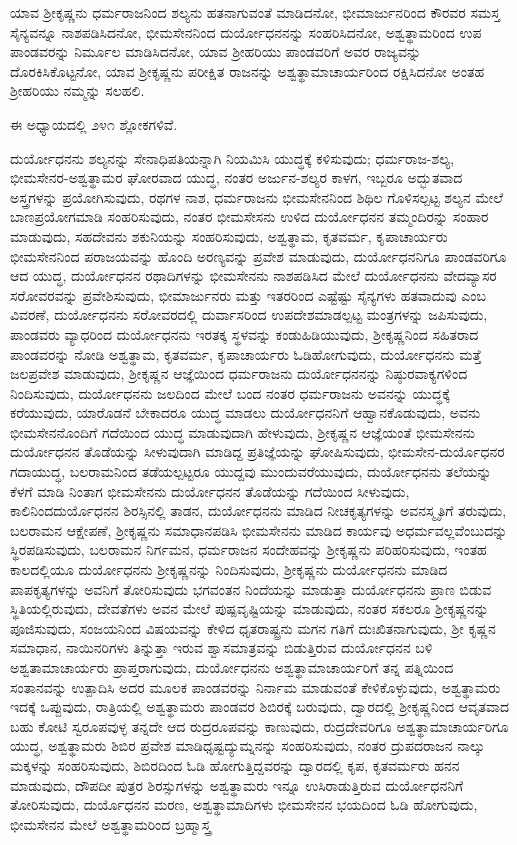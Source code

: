 ಯಾವ ಶ‍್ರೀಕೃಷ್ಣನು ಧರ್ಮರಾಜನಿಂದ ಶಲ್ಯನು ಹತನಾಗುವಂತೆ ಮಾಡಿದನೋ, ಭೀಮಾರ್ಜುನರಿಂದ ಕೌರವರ ಸಮಸ್ತ ಸೈನ್ಯವನ್ನೂ ನಾಶಪಡಿಸಿದನೋ, ಭೀಮಸೇನನಿಂದ ದುರ್ಯೋಧನನನ್ನು ಸಂಹರಿಸಿದನೋ, ಅಶ್ವತ್ಥಾಮರಿಂದ ಉಪ ಪಾಂಡವರನ್ನು ನಿರ್ಮೂಲ ಮಾಡಿಸಿದನೋ, ಯಾವ ಶ‍್ರೀಹರಿಯು ಪಾಂಡವರಿಗೆ ಅವರ ರಾಜ್ಯವನ್ನು ದೊರಕಿಸಿಕೊಟ್ಟನೋ, ಯಾವ ಶ‍್ರೀಕೃಷ್ಣನು ಪರೀಕ್ಷಿತ ರಾಜನನ್ನು ಅಶ್ವತ್ಥಾಮಾಚಾರ್ಯರಿಂದ ರಕ್ಷಿಸಿದನೋ ಅಂತಹ ಶ‍್ರೀಹರಿಯು ನಮ್ಮನ್ನು ಸಲಹಲಿ.

ಈ ಅಧ್ಯಾಯದಲ್ಲಿ ೨೪೧ ಶ್ಲೋಕಗಳಿವೆ.

ದುರ್ಯೋಧನನು ಶಲ್ಯನನ್ನು ಸೇನಾಧಿಪತಿಯನ್ನಾಗಿ ನಿಯಮಿಸಿ ಯುದ್ಧಕ್ಕೆ ಕಳಿಸುವುದು; ಧರ್ಮರಾಜ-ಶಲ್ಯ, ಭೀಮಸೇನರ-ಅಶ್ವತ್ಥಾಮರ ಘೋರವಾದ ಯುದ್ಧ, ನಂತರ ಅರ್ಜುನ-ಶಲ್ಯರ ಕಾಳಗ, ಇಬ್ಬರೂ ಅದ್ಭುತವಾದ ಅಸ್ತ್ರಗಳನ್ನು ಪ್ರಯೋಗಿಸುವುದು, ರಥಗಳ ನಾಶ, ಧರ್ಮರಾಜನು ಭೀಮಸೇನನಿಂದ ಶಿಥಿಲ ಗೊಳಿಸಲ್ಪಟ್ಟ ಶಲ್ಯನ ಮೇಲೆ ಬಾಣಪ್ರಯೋಗಮಾಡಿ ಸಂಹರಿಸುವುದು, ನಂತರ ಭೀಮಸೇಸನು ಉಳಿದ ದುರ್ಯೋಧನನ ತಮ್ಮಂದಿರನ್ನು ಸಂಹಾರ ಮಾಡುವುದು, ಸಹದೇವನು ಶಕುನಿಯನ್ನು ಸಂಹರಿಸುವುದು, ಅಶ್ವತ್ಥಾಮ, ಕೃತವರ್ಮ, ಕೃಪಾಚಾರ್ಯರು ಭೀಮಸೇನನಿಂದ ಪರಾಜಯವನ್ನು ಹೊಂದಿ ಅರಣ್ಯವನ್ನು ಪ್ರವೇಶ ಮಾಡುವುದು, ದುರ್ಯೋಧನನಿಗೂ ಪಾಂಡವರಿಗೂ ಆದ ಯುದ್ಧ, ದುರ್ಯೋಧನನ ರಥಾದಿಗಳನ್ನು ಭೀಮಸೇನನು ನಾಶಪಡಿಸಿದ ಮೇಲೆ ದುರ್ಯೋಧನನು ವೇದವ್ಯಾಸರ ಸರೋವರವನ್ನು ಪ್ರವೇಶಿಸುವುದು, ಭೀಮಾರ್ಜುನರು ಮತ್ತು ಇತರರಿಂದ ಎಷ್ಟೆಷ್ಟು ಸೈನ್ಯಗಳು ಹತವಾದುವು ಎಂಬ ವಿವರಣೆ, ದುರ್ಯೋಧನನು ಸರೋವರದಲ್ಲಿ ದುರ್ವಾಸರಿಂದ ಉಪದೇಶಮಾಡಲ್ಪಟ್ಟ ಮಂತ್ರಗಳನ್ನು ಜಪಿಸುವುದು, ಪಾಂಡವರು ವ್ಯಾಧರಿಂದ ದುರ್ಯೋಧನನು ಇರತಕ್ಕ ಸ್ಥಳವನ್ನು ಕಂಡುಹಿಡಿಯುವುದು, ಶ‍್ರೀಕೃಷ್ಣನಿಂದ ಸಹಿತರಾದ ಪಾಂಡವರನ್ನು ನೋಡಿ ಅಶ್ವತ್ಥಾಮ, ಕೃತವರ್ಮ, ಕೃಪಾಚಾರ್ಯರು ಓಡಿಹೋಗುವುದು, ದುರ್ಯೋಧನನು ಮತ್ತೆ ಜಲಪ್ರವೇಶ ಮಾಡುವುದು, ಶ‍್ರೀಕೃಷ್ಣನ ಆಜ್ಞೆಯಿಂದ ಧರ್ಮರಾಜನು ದುರ್ಯೋಧನನನ್ನು ನಿಷ್ಠುರವಾಕ್ಯಗಳಿಂದ ನಿಂದಿಸುವುದು, ದುರ್ಯೋಧನನು ಜಲದಿಂದ ಮೇಲೆ ಬಂದ ನಂತರ ಧರ್ಮರಾಜನು ಅವನನ್ನು ಯುದ್ಧಕ್ಕೆ ಕರೆಯುವುದು, ಯಾರೊಡನೆ ಬೇಕಾದರೂ ಯುದ್ಧ ಮಾಡಲು ದುರ್ಯೋಧನನಿಗೆ ಆಹ್ವಾನಕೊಡುವುದು, ಅವನು ಭೀಮಸೇನನೊಂದಿಗೆ ಗದೆಯಿಂದ ಯುದ್ಧ ಮಾಡುವುದಾಗಿ ಹೇಳುವುದು, ಶ‍್ರೀಕೃಷ್ಣನ ಆಜ್ಞೆಯಂತೆ ಭೀಮಸೇನನು ದುರ್ಯೋಧನನ ತೊಡೆಯನ್ನು ಸೀಳುವುದಾಗಿ ಮಾಡಿದ್ದ ಪ್ರತಿಜ್ಞೆಯನ್ನು ಘೋಷಿಸುವುದು, ಭೀಮಸೇನ-ದುರ್ಯೊಧನರ ಗದಾಯುದ್ಧ, ಬಲರಾಮನಿಂದ ತಡೆಯಲ್ಪಟ್ಟರೂ ಯುದ್ದವು ಮುಂದುವರೆಯುವುದು, ದುರ್ಯೋಧನನು ತಲೆಯನ್ನು ಕೆಳಗೆ ಮಾಡಿ ನಿಂತಾಗ ಭೀಮ\-ಸೇನನು ದುರ್ಯೋಧನನ ತೊಡೆಯನ್ನು ಗದೆಯಿಂದ ಸೀಳುವುದು, ಕಾಲಿನಿಂದ\break ದುರ್ಯೊಧನನ ಶಿರಸ್ಸಿನಲ್ಲಿ ತಾಡನ, ದುರ್ಯೋಧನನು ಮಾಡಿದ ನೀಚಕೃತ್ಯಗಳನ್ನು ಅವನಸ್ಮೃತಿಗೆ ತರುವುದು, ಬಲರಾಮನ ಆಕ್ಷೇಪಣೆ, ಶ‍್ರೀಕೃಷ್ಣನು ಸಮಾಧಾನಪಡಿಸಿ ಭೀಮಸೇನನು ಮಾಡಿದ ಕಾರ್ಯವು ಅಧರ್ಮವಲ್ಲವೆಂಬುದನ್ನು ಸ್ಥಿರಪಡಿಸುವುದು, ಬಲರಾಮನ ನಿರ್ಗಮನ, ಧರ್ಮರಾಜನ ಸಂದೇಹವನ್ನು ಶ‍್ರೀಕೃಷ್ಣನು ಪರಿಹರಿಸುವುದು, ಇಂತಹ ಕಾಲದಲ್ಲಿಯೂ ದುರ್ಯೋಧನನು ಶ‍್ರೀಕೃಷ್ಣನನ್ನು ನಿಂದಿಸುವುದು, ಶ‍್ರೀಕೃಷ್ಣನು ದುರ್ಯೋಧನನು ಮಾಡಿದ ಪಾಪಕೃತ್ಯಗಳನ್ನು ಅವನಿಗೆ ತೋರಿಸುವುದು ಭಗವಂತನ ನಿಂದೆಯನ್ನು ಮಾಡುತ್ತಾ ದುರ್ಯೋಧನನು ಪ್ರಾಣ ಬಿಡುವ ಸ್ಥಿತಿಯಲ್ಲಿರುವುದು, ದೇವತೆಗಳು ಅವನ ಮೇಲೆ ಪುಷ್ಪವೃಷ್ಟಿಯನ್ನು ಮಾಡುವುದು, ನಂತರ ಸಕಲರೂ ಶ‍್ರೀಕೃಷ್ಣನನ್ನು ಪೂಜಿಸುವುದು, ಸಂಜಯನಿಂದ ವಿಷಯವನ್ನು ಕೇಳಿದ ಧೃತರಾಷ್ಟ್ರನು ಮಗನ ಗತಿಗೆ ದುಃಖಿತನಾಗುವುದು, ಶ‍್ರೀ ಕೃಷ್ಣನ ಸಮಾಧಾನ, ನಾಯಿನರಿಗಳು ತಿನ್ನುತ್ತಾ ಇರುವ ಶ್ವಾಸಮಾತ್ರವನ್ನು ಬಿಡುತ್ತಿರುವ ದುರ್ಯೋಧನನ ಬಳಿ ಅಶ್ವತಾಮಾಚಾರ್ಯರು ಪ್ರಾಪ್ತರಾಗುವುದು, ದುರ್ಯೋಧನನು ಅಶ್ವತ್ಥಾಮಾಚಾರ್ಯರಿಗೆ ತನ್ನ ಪತ್ನಿಯಿಂದ ಸಂತಾನವನ್ನು ಉತ್ಪಾದಿಸಿ ಅದರ ಮೂಲಕ ಪಾಂಡವರನ್ನು ನಿರ್ನಾಮ ಮಾಡುವಂತೆ ಕೇಳಿಕೊಳ್ಳುವುದು, ಅಶ್ವತ್ಥಾಮರು ಇದಕ್ಕೆ ಒಪ್ಪುವುದು, ರಾತ್ರಿಯಲ್ಲಿ ಅಶ್ವತ್ಥಾಮರು ಪಾಂಡವರ ಶಿಬಿರಕ್ಕೆ ಬರುವುದು, ದ್ವಾರದಲ್ಲಿ ಶ‍್ರೀಕೃಷ್ಣನಿಂದ ಆವೃತವಾದ ಬಹು ಕೋಟಿ ಸ್ವರೂಪವುಳ್ಳ ತನ್ನದೇ ಆದ ರುದ್ರರೂಪವನ್ನು ಕಾಣುವುದು, ರುದ್ರ\-ದೇವರಿಗೂ ಅಶ್ವತ್ಥಾಮಾಚಾರ್ಯರಿಗೂ ಯುದ್ಧ, ಅಶ್ವತ್ಥಾಮರು ಶಿಬಿರ ಪ್ರವೇಶ ಮಾಡಿ\break ಧೃಷ್ಟದ್ಯುಮ್ನನನ್ನು ಸಂಹರಿಸುವುದು, ನಂತರ ದ್ರುಪದರಾಜನ ನಾಲ್ಕು ಮಕ್ಕಳನ್ನು ಸಂಹರಿಸುವುದು, ಶಿಬಿರದಿಂದ ಓಡಿ ಹೋಗುತ್ತಿದ್ದವರನ್ನು ದ್ವಾರದಲ್ಲಿ ಕೃಪ, ಕೃತವರ್ಮರು ಹನನ ಮಾಡುವುದು, ದೌಪದೀ ಪುತ್ರರ ಶಿರಸ್ಸುಗಳನ್ನು ಅಶ್ವತ್ಥಾಮರು ಇನ್ನೂ ಉಸಿರಾಡುತ್ತಿರುವ ದುರ್ಯೋಧನನಿಗೆ ತೋರಿಸುವುದು, ದುರ್ಯೊಧನನ ಮರಣ, ಅಶ್ವತ್ಥಾಮಾದಿಗಳು ಭೀಮಸೇನನ ಭಯದಿಂದ ಓಡಿ ಹೋಗುವುದು, ಭೀಮಸೇನನ ಮೇಲೆ ಅಶ್ವತ್ಥಾಮರಿಂದ ಬ್ರಹ್ಮಾಸ್ತ್ರ 